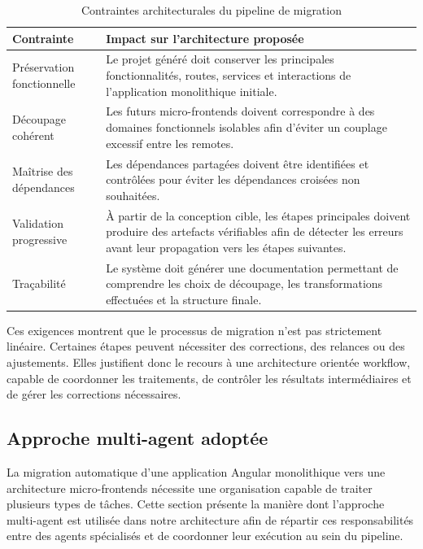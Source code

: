 \begingroup
\small
\setlength{\tabcolsep}{4pt}
\renewcommand{\arraystretch}{1.25}
\begin{longtable}{|P{3.5cm}|P{9.65cm}|}
\caption{Contraintes architecturales du pipeline de migration}\label{tab:contraintes-architecture}\\
\hline
\textbf{Contrainte} & \textbf{Impact sur l'architecture proposée} \\
\hline
Préservation fonctionnelle & Le projet généré doit conserver les principales fonctionnalités, routes, services et interactions de l'application monolithique initiale. \\
\hline
Découpage cohérent & Les futurs micro-frontends doivent correspondre à des domaines fonctionnels isolables afin d'éviter un couplage excessif entre les remotes. \\
\hline
Maîtrise des dépendances & Les dépendances partagées doivent être identifiées et contrôlées pour éviter les dépendances croisées non souhaitées. \\
\hline
Validation progressive & À partir de la conception cible, les étapes principales doivent produire des artefacts vérifiables afin de détecter les erreurs avant leur propagation vers les étapes suivantes. \\
\hline
Traçabilité & Le système doit générer une documentation permettant de comprendre les choix de découpage, les transformations effectuées et la structure finale. \\
\hline
\end{longtable}
\endgroup

Ces exigences montrent que le processus de migration n'est pas strictement linéaire. Certaines étapes peuvent nécessiter des corrections, des relances ou des ajustements. Elles justifient donc le recours à une architecture orientée workflow, capable de coordonner les traitements, de contrôler les résultats intermédiaires et de gérer les corrections nécessaires.

\subsection{Approche multi-agent adoptée}

La migration automatique d'une application Angular monolithique vers une architecture micro-frontends nécessite une organisation capable de traiter plusieurs types de tâches. Cette section présente la manière dont l'approche multi-agent est utilisée dans notre architecture afin de répartir ces responsabilités entre des agents spécialisés et de coordonner leur exécution au sein du pipeline.

